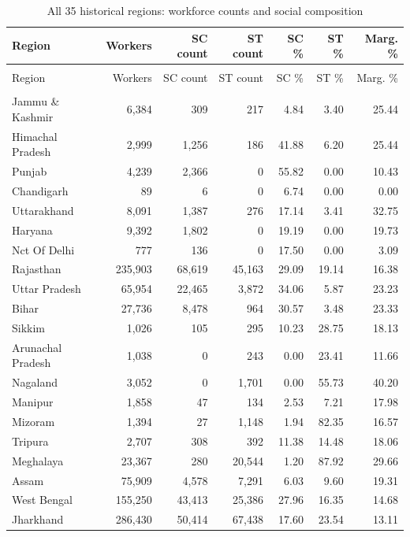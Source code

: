 \documentclass[11pt,a4paper]{report}
\begin{document}
\begin{longtable}{>{\raggedright\arraybackslash}p{4cm}rrrrrr}
\caption{All 35 historical regions: workforce counts and social composition}\\\toprule
Region & Workers & SC count & ST count & SC \% & ST \% & Marg. \% \\\midrule\endfirsthead
\multicolumn{7}{l}{\textit{Continued from previous page}}\\\toprule
Region & Workers & SC count & ST count & SC \% & ST \% & Marg. \% \\\midrule\endhead
\midrule\multicolumn{7}{r}{\textit{Continued on next page}}\\\endfoot\bottomrule\endlastfoot
Jammu \& Kashmir & 6,384 & 309 & 217 & 4.84 & 3.40 & 25.44 \\
Himachal Pradesh & 2,999 & 1,256 & 186 & 41.88 & 6.20 & 25.44 \\
Punjab & 4,239 & 2,366 & 0 & 55.82 & 0.00 & 10.43 \\
Chandigarh & 89 & 6 & 0 & 6.74 & 0.00 & 0.00 \\
Uttarakhand & 8,091 & 1,387 & 276 & 17.14 & 3.41 & 32.75 \\
Haryana & 9,392 & 1,802 & 0 & 19.19 & 0.00 & 19.73 \\
Nct Of Delhi & 777 & 136 & 0 & 17.50 & 0.00 & 3.09 \\
Rajasthan & 235,903 & 68,619 & 45,163 & 29.09 & 19.14 & 16.38 \\
Uttar Pradesh & 65,954 & 22,465 & 3,872 & 34.06 & 5.87 & 23.23 \\
Bihar & 27,736 & 8,478 & 964 & 30.57 & 3.48 & 23.33 \\
Sikkim & 1,026 & 105 & 295 & 10.23 & 28.75 & 18.13 \\
Arunachal Pradesh & 1,038 & 0 & 243 & 0.00 & 23.41 & 11.66 \\
Nagaland & 3,052 & 0 & 1,701 & 0.00 & 55.73 & 40.20 \\
Manipur & 1,858 & 47 & 134 & 2.53 & 7.21 & 17.98 \\
Mizoram & 1,394 & 27 & 1,148 & 1.94 & 82.35 & 16.57 \\
Tripura & 2,707 & 308 & 392 & 11.38 & 14.48 & 18.06 \\
Meghalaya & 23,367 & 280 & 20,544 & 1.20 & 87.92 & 29.66 \\
Assam & 75,909 & 4,578 & 7,291 & 6.03 & 9.60 & 19.31 \\
West Bengal & 155,250 & 43,413 & 25,386 & 27.96 & 16.35 & 14.68 \\
Jharkhand & 286,430 & 50,414 & 67,438 & 17.60 & 23.54 & 13.11 \\

\end{longtable}
\end{document}
